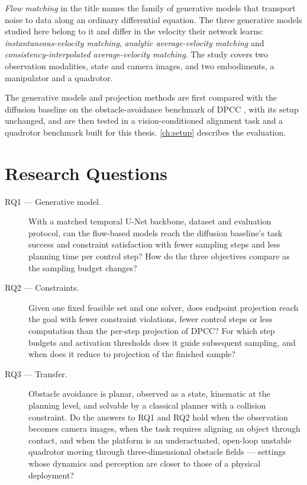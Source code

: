 \documentclass[headsepline,footsepline,footinclude=false,oneside,fontsize=11pt,paper=a4,listof=totoc,bibliography=totoc]{scrbook}
\theoremstyle{definition}
\theoremstyle{plain}
\theoremstyle{remark}
\begin{document}
\emph{Flow matching} in the title names the family of generative models that transport noise to data
along an ordinary differential equation. The three generative models studied here belong to it and
differ in the velocity their network learns: \emph{instantaneous-velocity matching},
\emph{analytic average-velocity matching} and \emph{consistency-interpolated average-velocity
matching}. The study covers two observation modalities, state and camera images, and two embodiments, a manipulator
and a quadrotor.

The generative models and projection methods are first compared with the diffusion baseline on the
obstacle-avoidance benchmark of \ac{DPCC} \parencite{romer2025diffusion,jia2024towards}, with its
setup unchanged, and are then tested in a vision-conditioned alignment task and a quadrotor benchmark
built for this thesis. \autoref{ch:setup} describes the evaluation.

\section{Research Questions}\label{sec:intro:rqs}

\begin{description}
  \item[RQ1 --- Generative model.] With a matched temporal U-Net backbone, dataset and evaluation
    protocol, can the flow-based models reach the diffusion baseline's task success and constraint
    satisfaction with fewer sampling steps and less planning time per control step? How do the three
    objectives compare as the sampling budget changes?
  \item[RQ2 --- Constraints.] Given one fixed feasible set and one solver, does endpoint projection
    reach the goal with fewer constraint violations, fewer control steps or less computation than
    the per-step projection of \ac{DPCC}? For which step budgets and activation thresholds does it
    guide subsequent sampling, and when does it reduce to projection of the finished sample?
  \item[RQ3 --- Transfer.] Obstacle avoidance is planar, observed as a state, kinematic at the
    planning level, and solvable by a classical planner with a collision constraint. Do the answers
    to RQ1 and RQ2 hold when the observation becomes camera images, when the task requires aligning
    an object through contact, and when the platform is an underactuated, open-loop unstable
    quadrotor moving through three-dimensional obstacle fields --- settings whose dynamics and
    perception are closer to those of a physical deployment?
\end{description}
\end{document}
